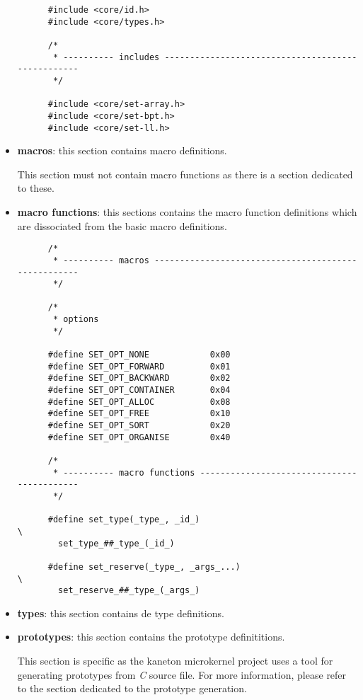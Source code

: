 \begin{itemize}
\begin{verbatim}
      #include <core/id.h>
      #include <core/types.h>

      /*
       * ---------- includes --------------------------------------------------
       */

      #include <core/set-array.h>
      #include <core/set-bpt.h>
      #include <core/set-ll.h>
    \end{verbatim}
  \item
    \textbf{macros}: this section contains macro definitions.

    \-

    This section must not contain macro functions as there is a section
    dedicated to these.
  \item
    \textbf{macro functions}: this sections contains the macro function
    definitions which are dissociated from the basic macro definitions.

    \begin{verbatim}
      /*
       * ---------- macros ----------------------------------------------------
       */

      /*
       * options
       */

      #define SET_OPT_NONE            0x00
      #define SET_OPT_FORWARD         0x01
      #define SET_OPT_BACKWARD        0x02
      #define SET_OPT_CONTAINER       0x04
      #define SET_OPT_ALLOC           0x08
      #define SET_OPT_FREE            0x10
      #define SET_OPT_SORT            0x20
      #define SET_OPT_ORGANISE        0x40

      /*
       * ---------- macro functions -------------------------------------------
       */

      #define set_type(_type_, _id_)                                    \
        set_type_##_type_(_id_)

      #define set_reserve(_type_, _args_...)                            \
        set_reserve_##_type_(_args_)
    \end{verbatim}
  \item
    \textbf{types}: this section contains de type definitions.
  \item
    \textbf{prototypes}: this section contains the prototype definititions.

    \-

    This section is specific as the kaneton microkernel project uses a
    tool for generating prototypes from \textit{C} source file. For more
    information, please refer to the section dedicated to the prototype
    generation.


\end{itemize}
